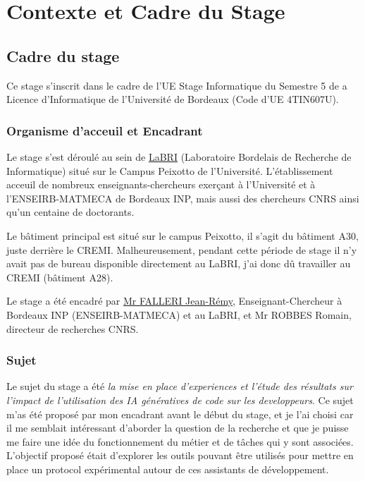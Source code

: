\chapter{Contexte et Cadre du Stage}
\label{context}

\section{Cadre du stage}

Ce stage s'inscrit dans le cadre de l'UE Stage Informatique du Semestre 5 de a Licence d'Informatique de l'Université de Bordeaux (Code d'UE 4TIN607U).

\subsection{Organisme d'acceuil et Encadrant}

Le stage s'est déroulé au sein de \href{https://www.labri.fr/}{LaBRI} (Laboratoire Bordelais de Recherche de Informatique) situé sur le Campus Peixotto de l'Université.
L'établissement acceuil de nombreux enseignants-chercheurs exerçant à l'Université et à l'ENSEIRB-MATMECA de Bordeaux INP,
mais aussi des chercheurs CNRS ainsi qu'un centaine de doctorants.

Le bâtiment principal est situé sur le campus Peixotto, il s'agit du bâtiment A30, juste derrière le CREMI.
Malheureusement, pendant cette période de stage il n'y avait pas de bureau disponible directement au LaBRI,
j'ai donc dû travailler au CREMI (bâtiment A28).

Le stage a été encadré par \href{https://www.labri.fr/perso/falleri/}{Mr FALLERI Jean-Rémy}, Enseignant-Chercheur à Bordeaux INP (ENSEIRB-MATMECA) et au LaBRI, et Mr ROBBES Romain, directeur de recherches CNRS.

\subsection{Sujet}

Le sujet du stage a été \emph{la mise en place d'experiences et l'étude des résultats sur l’impact de l’utilisation des IA génératives de code sur les developpeurs}.
Ce sujet m'as été proposé par mon encadrant avant le début du stage, et je l'ai choisi car il me semblait intéressant d'aborder la question de la recherche et que je puisse me faire une idée du fonctionnement du métier et de tâches qui y sont associées.
L'objectif proposé était d'explorer les outils pouvant être utilisés pour mettre en place un protocol expérimental autour de ces assistants de développement.
